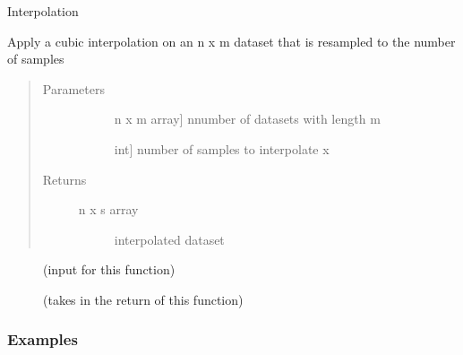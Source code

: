\documentclass[letterpaper,10pt,english]{sphinxmanual}
\begin{document}
\begin{fulllineitems}
\label{\detokenize{generated/seg1d.algorithm.resample:seg1d.algorithm.resample}}
\sphinxAtStartPar
Interpolation

\sphinxAtStartPar
Apply a cubic interpolation on an n x m dataset that is resampled
to the number of samples
\begin{quote}\begin{description}
\item[{Parameters}] \leavevmode\begin{description}
\item[{}] \leavevmode{[}n x m array{]}
\sphinxAtStartPar
n\sphinxhyphen{}number of datasets with length m

\item[{}] \leavevmode{[}int{]}
\sphinxAtStartPar
number of samples to interpolate x

\end{description}

\item[{Returns}] \leavevmode\begin{description}
\item[{n x s array}] \leavevmode
\sphinxAtStartPar
interpolated dataset

\end{description}

\end{description}\end{quote}


\nopagebreak

\begin{description}
\item[{{\hyperref[\detokenize{generated/seg1d.algorithm.cluster:seg1d.algorithm.cluster}]{}}}] \leavevmode
\sphinxAtStartPar
(input for this function)

\item[{{\hyperref[\detokenize{generated/seg1d.algorithm.resample:seg1d.algorithm.resample}]{}}}] \leavevmode
\sphinxAtStartPar
(takes in the return of this function)

\end{description}


\subsubsection*{Examples}


\end{fulllineitems}
\end{document}

